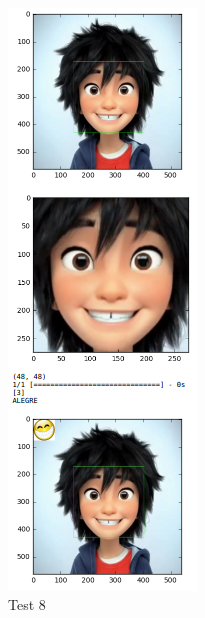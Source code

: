 \begin{frame}
\begin{figure}[!htbp]
\begin{multicols}{2}
 \includegraphics[angle=0,width=50mm]{Imagenes/test8.png}
     \caption{Test 8}
     \label{fig:test8} 
 \end{multicols}       
\end{figure}

\end{frame}



